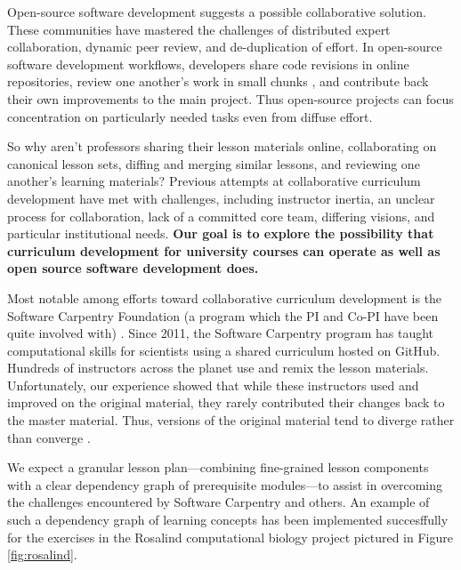 \documentclass[11pt]{article}
\begin{document}
          Open-source software development suggests a possible collaborative solution.
          These communities have mastered the challenges of distributed expert collaboration, 
          dynamic peer review, and de-duplication of effort. In open-source 
          software development workflows, developers share code revisions in online repositories, 
          review one another's work in small chunks \cite{wilson_best_2014}, 
          and contribute back their own improvements to the main project.
          Thus open-source projects can focus concentration on particularly needed tasks
          even from diffuse effort.

          So why aren't professors sharing their lesson materials online, 
          collaborating on canonical lesson sets, diffing and merging similar 
          lessons, and reviewing one another's learning materials?
          Previous attempts at collaborative curriculum development have met with 
          challenges, including instructor inertia, an unclear process for collaboration,
          lack of a committed core team, differing visions, and particular institutional needs.
          \textbf{Our goal is to explore the possibility that curriculum development for 
          university courses can operate as well as open source software development 
          does.}
          
          Most notable among efforts toward collaborative curriculum 
          development is the Software Carpentry Foundation (a program
          which the PI and Co-PI have been quite involved with) 
          \cite{wilson_software_2014}.  Since 2011, the Software Carpentry program has taught 
          computational skills for scientists using a shared curriculum hosted 
          on GitHub. Hundreds of instructors across the planet use and remix 
          the lesson materials. Unfortunately, our experience showed that while these 
          instructors used and improved on the original material, they rarely 
          contributed their changes back to the master material. Thus, versions 
          of the original material tend to diverge rather than converge 
          \cite{wilson_software_2014,wilson_software_2014-1}.
          
          We expect a granular lesson plan---combining fine-grained lesson components
          with a clear dependency graph of prerequisite modules---to assist in 
          overcoming the challenges encountered by Software Carpentry and 
          others. An example of such a dependency graph of learning concepts has been implemented 
          succesffully for the exercises in the Rosalind\cite{loman_so_2013}
          computational biology project pictured in Figure \ref{fig:rosalind}.
\end{document}
